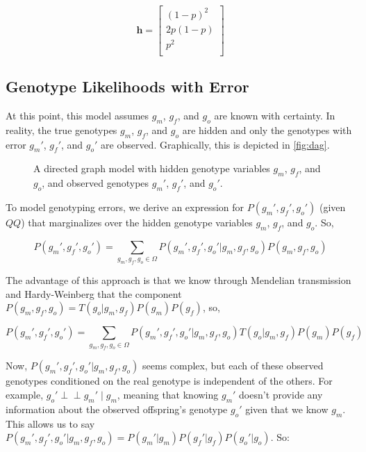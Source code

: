 \documentclass[11pt]{article}
\begin{document}
$$
\mathbf{h} = \left[ \begin{array}{c}
(1 - p)^2 \\
2p(1-p) \\
p^2 \\
\end{array} \right]
$$

\subsection{Genotype Likelihoods with Error}

At this point, this model assumes $g_m$, $g_f$, and $g_o$ are known with
certainty. In reality, the true genotypes $g_m$, $g_f$, and $g_o$ are hidden
and only the genotypes with error $g_m'$, $g_f'$, and $g_o'$ are observed.
Graphically, this is depicted in \autoref{fig:dag}.

\begin{figure}
\centering
\begingroup
{}%

\endgroup

\caption{A directed graph model with hidden genotype variables $g_m$, $g_f$,
and $g_o$, and observed genotypes $g_m'$, $g_f'$, and $g_o'$.}

\label{fig:dag}

\end{figure}

To model genotyping errors, we derive an expression for $P(g_m', g_f', g_o')$
(given $QQ$) that marginalizes over the hidden genotype variables $g_m$, $g_f$,
and $g_o$. So,

$$
P(g_m', g_f', g_o') = \sum_{g_m,g_f,g_o \in \Omega} P(g_m', g_f', g_o' | g_m, g_f, g_o) P(g_m, g_f, g_o)
$$

The advantage of this approach is that we know through Mendelian transmission
and Hardy-Weinberg that the component $P(g_m, g_f, g_o) = T(g_o | g_m, g_f)
P(g_m) P(g_f)$, so,

$$
P(g_m', g_f', g_o') = \sum_{g_m,g_f,g_o \in \Omega} P(g_m', g_f', g_o' | g_m, g_f, g_o) T(g_o | g_m, g_f) P(g_m) P(g_f)
$$

Now, $P(g_m', g_f', g_o' | g_m, g_f, g_o)$ seems complex, but each of these
observed genotypes conditioned on the real genotype is independent of the
others. For example, $g_o' \perp\!\!\!\perp g_m'\; | \;g_m$, meaning that
knowing $g_m'$ doesn't provide any information about the observed offspring's
genotype $g_o'$ given that we know $g_m$. This allows us to say $P(g_m', g_f',
g_o' | g_m, g_f, g_o) = P(g_m' | g_m) P(g_f'|g_f) P(g_o'|g_o)$. So:
\end{document}
